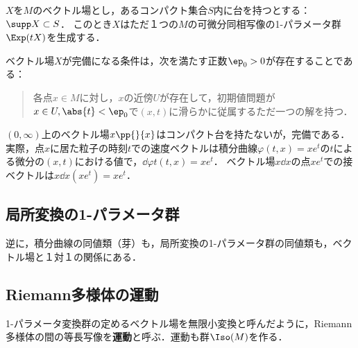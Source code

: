 \documentclass[uplatex,dvipdfmx]{jsreport}
\begin{document}
\begin{theorem}
    $X$を$M$のベクトル場とし，あるコンパクト集合$S$内に台を持つとする：$\supp X\subset S$．
    このとき$X$はただ１つの$M$の可微分同相写像の1-パラメータ群$\Exp(tX)$を生成する．
\end{theorem}

\begin{corollary}[精緻化]
    ベクトル場$X$が完備になる条件は，次を満たす正数$\ep_0>0$が存在することである：
    \begin{quote}
        各点$x\in M$に対し，$x$の近傍$U$が存在して，初期値問題が$x\in U,\abs{t}<\ep_0$で$(x,t)$に滑らかに従属するただ一つの解を持つ．
    \end{quote}
\end{corollary}

\begin{example}
    $(0,\infty)$上のベクトル場$x\pp{}{x}$はコンパクト台を持たないが，完備である．
    実際，点$x$に居た粒子の時刻$t$での速度ベクトルは積分曲線$\varphi(t,x)=xe^t$の$t$による微分の$(x,t)$における値で，$\dd{\varphi}{t}(t,x)=xe^t$．
    ベクトル場$x\dd{}{x}$の点$xe^t$での接ベクトルは$x\dd{}{x}(xe^t)=xe^t$．
\end{example}

\subsection{局所変換の1-パラメータ群}

\begin{tcolorbox}[colframe=ForestGreen, colback=ForestGreen!10!white,breakable,colbacktitle=ForestGreen!40!white,coltitle=black,fonttitle=\bfseries\sffamily,
title=]
    逆に，積分曲線の同値類（芽）も，局所変換の1-パラメータ群の同値類も，ベクトル場と１対１の関係にある．
\end{tcolorbox}

\subsection{Riemann多様体の運動}

\begin{tcolorbox}[colframe=ForestGreen, colback=ForestGreen!10!white,breakable,colbacktitle=ForestGreen!40!white,coltitle=black,fonttitle=\bfseries\sffamily,
title=]
    1-パラメータ変換群の定めるベクトル場を無限小変換と呼んだように，Riemann多様体の間の等長写像を\textbf{運動}と呼ぶ．運動も群$\Iso(M)$を作る．
\end{tcolorbox}
\end{document}
